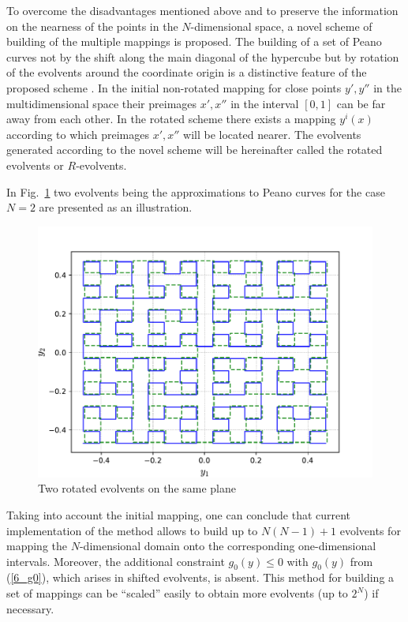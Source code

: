 \documentclass[runningheads]{llncs}
\begin{document}
To overcome the disadvantages mentioned above and to preserve the information on the nearness of the points in the $N$-dimensional space, a novel scheme of building of the multiple mappings is proposed. The building of a set of Peano curves not by the shift along the main diagonal of the hypercube but by rotation of the evolvents around the coordinate origin is a distinctive feature of the proposed scheme \cite{Gergel2009}. In the initial non-rotated mapping for close points $y', y''$ in the multidimensional space their preimages  $x', x''$ in the interval $[0,1]$ can be far away from each other. In the rotated scheme there exists a mapping $y^i(x)$ according to which preimages $x', x''$ will be located nearer. The evolvents generated according to the novel scheme will be hereinafter called the rotated evolvents or $R$-evolvents.

In Fig.~\ref{6_fig_9} two evolvents being the approximations to Peano curves for the case $N=2$ are presented as an illustration.

\begin{figure}[t]
  \centering
  \includegraphics[width=0.6\linewidth]{pictures/rotated_1.pdf}
  \caption{Two rotated evolvents on the same plane}
  \label{6_fig_9}
\end{figure}

Taking into account the initial mapping, one can conclude that current implementation of the method allows to build up to $N(N-1)+1$ evolvents for mapping the $N$-dimensional domain onto the corresponding one-dimensional intervals. Moreover, the additional constraint  $g_0(y) \leq 0$ with $g_0(y)$ from (\ref{6_g0}), which arises in shifted evolvents, is absent. This method for building a set of mappings can be ``scaled'' easily to obtain more evolvents (up to $2^N$) if necessary.
\end{document}
